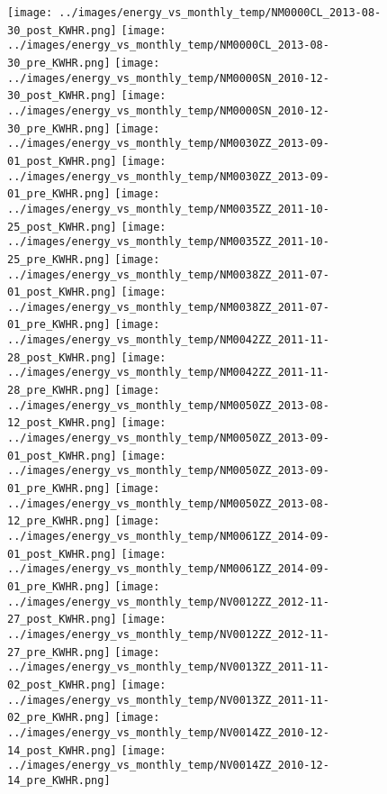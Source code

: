 \clearpage
\begin{figure}
\centering
\texttt{[image: ../images/energy\_vs\_monthly\_temp/NM0000CL\_2013-08-30\_post\_KWHR.png]}
\texttt{[image: ../images/energy\_vs\_monthly\_temp/NM0000CL\_2013-08-30\_pre\_KWHR.png]}
\texttt{[image: ../images/energy\_vs\_monthly\_temp/NM0000SN\_2010-12-30\_post\_KWHR.png]}
\texttt{[image: ../images/energy\_vs\_monthly\_temp/NM0000SN\_2010-12-30\_pre\_KWHR.png]}
\texttt{[image: ../images/energy\_vs\_monthly\_temp/NM0030ZZ\_2013-09-01\_post\_KWHR.png]}
\texttt{[image: ../images/energy\_vs\_monthly\_temp/NM0030ZZ\_2013-09-01\_pre\_KWHR.png]}
\texttt{[image: ../images/energy\_vs\_monthly\_temp/NM0035ZZ\_2011-10-25\_post\_KWHR.png]}
\texttt{[image: ../images/energy\_vs\_monthly\_temp/NM0035ZZ\_2011-10-25\_pre\_KWHR.png]}
\texttt{[image: ../images/energy\_vs\_monthly\_temp/NM0038ZZ\_2011-07-01\_post\_KWHR.png]}
\texttt{[image: ../images/energy\_vs\_monthly\_temp/NM0038ZZ\_2011-07-01\_pre\_KWHR.png]}
\texttt{[image: ../images/energy\_vs\_monthly\_temp/NM0042ZZ\_2011-11-28\_post\_KWHR.png]}
\texttt{[image: ../images/energy\_vs\_monthly\_temp/NM0042ZZ\_2011-11-28\_pre\_KWHR.png]}
\texttt{[image: ../images/energy\_vs\_monthly\_temp/NM0050ZZ\_2013-08-12\_post\_KWHR.png]}
\texttt{[image: ../images/energy\_vs\_monthly\_temp/NM0050ZZ\_2013-09-01\_post\_KWHR.png]}
\texttt{[image: ../images/energy\_vs\_monthly\_temp/NM0050ZZ\_2013-09-01\_pre\_KWHR.png]}
\texttt{[image: ../images/energy\_vs\_monthly\_temp/NM0050ZZ\_2013-08-12\_pre\_KWHR.png]}
\texttt{[image: ../images/energy\_vs\_monthly\_temp/NM0061ZZ\_2014-09-01\_post\_KWHR.png]}
\texttt{[image: ../images/energy\_vs\_monthly\_temp/NM0061ZZ\_2014-09-01\_pre\_KWHR.png]}
\texttt{[image: ../images/energy\_vs\_monthly\_temp/NV0012ZZ\_2012-11-27\_post\_KWHR.png]}
\texttt{[image: ../images/energy\_vs\_monthly\_temp/NV0012ZZ\_2012-11-27\_pre\_KWHR.png]}
\texttt{[image: ../images/energy\_vs\_monthly\_temp/NV0013ZZ\_2011-11-02\_post\_KWHR.png]}
\texttt{[image: ../images/energy\_vs\_monthly\_temp/NV0013ZZ\_2011-11-02\_pre\_KWHR.png]}
\texttt{[image: ../images/energy\_vs\_monthly\_temp/NV0014ZZ\_2010-12-14\_post\_KWHR.png]}
\texttt{[image: ../images/energy\_vs\_monthly\_temp/NV0014ZZ\_2010-12-14\_pre\_KWHR.png]}
\end{figure}
